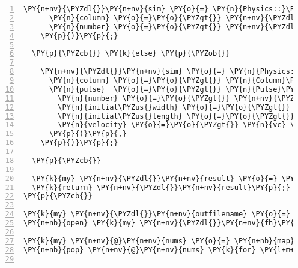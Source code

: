\begin{Verbatim}[commandchars=\\\{\},numbers=left,firstnumber=1,stepnumber=1]
    \PY{n+nv}{\PYZdl{}}\PY{n+nv}{sim} \PY{o}{=} \PY{n}{Physics::}\PY{n}{UEMColumn}\PY{o}{-}\PY{o}{\PYZgt{}}\PY{k}{new}\PY{p}{(}
      \PY{n}{column} \PY{o}{=}\PY{o}{\PYZgt{}} \PY{n+nv}{\PYZdl{}}\PY{n+nv}{column}\PY{p}{,}
      \PY{n}{number} \PY{o}{=}\PY{o}{\PYZgt{}} \PY{n+nv}{\PYZdl{}}\PY{n+nv}{num}\PY{p}{,}
    \PY{p}{)}\PY{p}{;}

  \PY{p}{\PYZcb{}} \PY{k}{else} \PY{p}{\PYZob{}}

    \PY{n+nv}{\PYZdl{}}\PY{n+nv}{sim} \PY{o}{=} \PY{n}{Physics::}\PY{n}{UEMColumn}\PY{o}{-}\PY{o}{\PYZgt{}}\PY{k}{new}\PY{p}{(}
      \PY{n}{column} \PY{o}{=}\PY{o}{\PYZgt{}} \PY{n}{Column}\PY{o}{-}\PY{o}{\PYZgt{}}\PY{k}{new}\PY{p}{(} \PY{n}{length} \PY{o}{=}\PY{o}{\PYZgt{}} \PY{l+s}{'15 cm'} \PY{p}{)}\PY{p}{,}
      \PY{n}{pulse}  \PY{o}{=}\PY{o}{\PYZgt{}} \PY{n}{Pulse}\PY{o}{-}\PY{o}{\PYZgt{}}\PY{k}{new}\PY{p}{(}
        \PY{n}{number} \PY{o}{=}\PY{o}{\PYZgt{}} \PY{n+nv}{\PYZdl{}}\PY{n+nv}{num}\PY{p}{,}
        \PY{n}{initial\PYZus{}width} \PY{o}{=}\PY{o}{\PYZgt{}} \PY{l+s}{'1 mm'}\PY{p}{,}
        \PY{n}{initial\PYZus{}length} \PY{o}{=}\PY{o}{\PYZgt{}} \PY{p}{(} \PY{n}{vc} \PY{o}{/} \PY{l+m+mi}{3} \PY{o}{*} \PY{l+m+mf}{1e-12} \PY{p}{)} \PY{o}{.} \PY{l+s}{' m'}\PY{p}{,}
        \PY{n}{velocity} \PY{o}{=}\PY{o}{\PYZgt{}} \PY{n}{vc} \PY{o}{/} \PY{l+m+mi}{3}\PY{p}{,}
      \PY{p}{)}\PY{p}{,}
    \PY{p}{)}\PY{p}{;}

  \PY{p}{\PYZcb{}}

  \PY{k}{my} \PY{n+nv}{\PYZdl{}}\PY{n+nv}{result} \PY{o}{=} \PY{n+nv}{\PYZdl{}}\PY{n+nv}{sim}\PY{o}{-}\PY{o}{\PYZgt{}}\PY{n}{propagate}\PY{p}{;}
  \PY{k}{return} \PY{n+nv}{\PYZdl{}}\PY{n+nv}{result}\PY{p}{;}
\PY{p}{\PYZcb{}}

\PY{k}{my} \PY{n+nv}{\PYZdl{}}\PY{n+nv}{outfilename} \PY{o}{=} \PY{n+nv}{\PYZdl{}}\PY{n+nv}{use\PYZus{}acc} \PY{p}{?} \PY{l+s}{'spacecharge\PYZus{}acc.dat'} \PY{p}{:} \PY{l+s}{'spacecharge\PYZus{}noacc.dat'}\PY{p}{;}
\PY{n+nb}{open} \PY{k}{my} \PY{n+nv}{\PYZdl{}}\PY{n+nv}{fh}\PY{p}{,} \PY{l+s}{'\PYZgt{}'}\PY{p}{,} \PY{n+nv}{\PYZdl{}}\PY{n+nv}{outfilename} \PY{o+ow}{or} \PY{n+nb}{die} \PY{l+s}{"Cannot open \PYZdl{}outfilename for writing"}\PY{p}{;}

\PY{k}{my} \PY{n+nv}{@}\PY{n+nv}{nums} \PY{o}{=} \PY{n+nb}{map} \PY{p}{\PYZob{}} \PY{p}{(}\PY{l+s}{"1e\PYZdl{}\PYZus{}"}\PY{p}{,} \PY{l+s}{"2.2e\PYZdl{}\PYZus{}"}\PY{p}{,} \PY{l+s}{"4.6e\PYZdl{}\PYZus{}"}\PY{p}{)} \PY{p}{\PYZcb{}} \PY{p}{(}\PY{l+m+mi}{0}\PY{o}{..}\PY{l+m+mi}{8}\PY{p}{)}\PY{p}{;}
\PY{n+nb}{pop} \PY{n+nv}{@}\PY{n+nv}{nums} \PY{k}{for} \PY{l+m+mi}{1}\PY{o}{..}\PY{l+m+mi}{2}\PY{p}{;}


\end{Verbatim}
